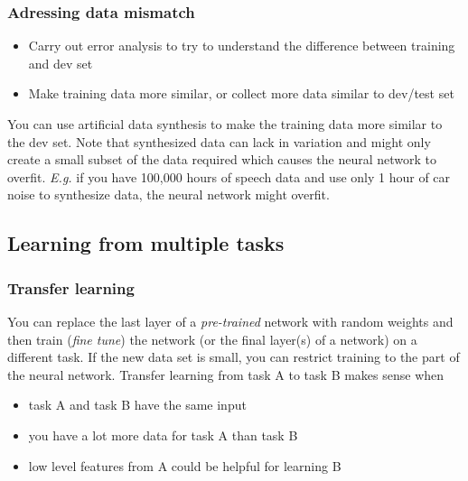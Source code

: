 \documentclass{article}
\begin{document}
\subsubsection{Adressing data mismatch}
\begin{itemize}
  \item Carry out error analysis to try to understand the difference between training and dev set
  \item Make training data more similar, or collect more data similar to dev/test set
\end{itemize}
You can use artificial data synthesis to make the training data more similar to the dev set.
Note that synthesized data can lack in variation and might only create a small subset of the data required
which causes the neural network to overfit.
\emph{E.g.} if you have 100,000 hours of speech data and use only 1 hour of car noise to synthesize data, the neural network might overfit.

\subsection{Learning from multiple tasks}
\subsubsection{Transfer learning}
You can replace the last layer of a \emph{pre-trained} network with random weights and then train
(\emph{fine tune}) the network (or the final layer(s) of a network) on a different task.
If the new data set is small, you can restrict training to the part of the neural network.
Transfer learning from task A to task B makes sense when
\begin{itemize}
  \item task A and task B have the same input
  \item you have a lot more data for task A than task B
  \item low level features from A could be helpful for learning B
\end{itemize}
\end{document}

